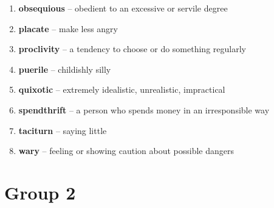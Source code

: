 \begin{enumerate}[wide,labelindent=0pt]
\item \textbf{obsequious} -- obedient to an excessive or servile degree
\item \textbf{placate} -- make less angry
\item \textbf{proclivity} -- a tendency to choose or do something regularly
\item \textbf{puerile} -- childishly silly
\item \textbf{quixotic} -- extremely idealistic, unrealistic, impractical
\item \textbf{spendthrift} -- a person who spends money in an irresponsible way
\item \textbf{taciturn} -- saying little
\item \textbf{wary} -- feeling or showing caution about possible dangers
\end{enumerate}


\newpage
\section{Group 2}

